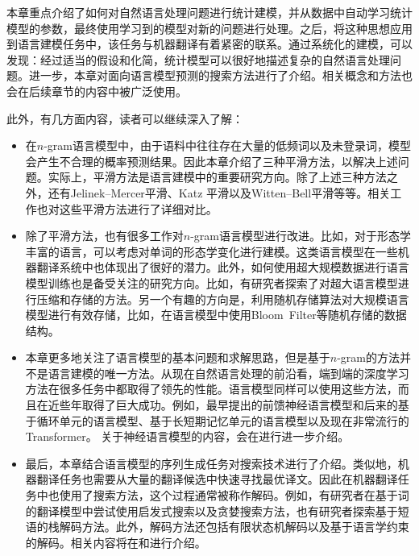 \parinterval 本章重点介绍了如何对自然语言处理问题进行统计建模，并从数据中自动学习统计模型的参数，最终使用学习到的模型对新的问题进行处理。之后，将这种思想应用到语言建模任务中，该任务与机器翻译有着紧密的联系。通过系统化的建模，可以发现：经过适当的假设和化简，统计模型可以很好地描述复杂的自然语言处理问题。进一步，本章对面向语言模型预测的搜索方法进行了介绍。相关概念和方法也会在后续章节的内容中被广泛使用。

\parinterval 此外，有几方面内容，读者可以继续深入了解：

\begin{adjustwidth}{1em}{}
\begin{itemize}
\vspace{0.5em}
\item 在$n$-gram语言模型中，由于语料中往往存在大量的低频词以及未登录词，模型会产生不合理的概率预测结果。因此本章介绍了三种平滑方法，以解决上述问题。实际上，平滑方法是语言建模中的重要研究方向。除了上述三种方法之外，还有Jelinek–Mercer平滑、Katz 平滑以及Witten–Bell平滑等等。相关工作也对这些平滑方法进行了详细对比。
\vspace{0.5em}
\item 除了平滑方法，也有很多工作对$n$-gram语言模型进行改进。比如，对于形态学丰富的语言，可以考虑对单词的形态学变化进行建模。这类语言模型在一些机器翻译系统中也体现出了很好的潜力。此外，如何使用超大规模数据进行语言模型训练也是备受关注的研究方向。比如，有研究者探索了对超大语言模型进行压缩和存储的方法。另一个有趣的方向是，利用随机存储算法对大规模语言模型进行有效存储，比如，在语言模型中使用Bloom\ Filter等随机存储的数据结构。
\vspace{0.5em}
\item 本章更多地关注了语言模型的基本问题和求解思路，但是基于$n$-gram的方法并不是语言建模的唯一方法。从现在自然语言处理的前沿看，端到端的深度学习方法在很多任务中都取得了领先的性能。语言模型同样可以使用这些方法，而且在近些年取得了巨大成功。例如，最早提出的前馈神经语言模型和后来的基于循环单元的语言模型、基于长短期记忆单元的语言模型以及现在非常流行的Transformer。 关于神经语言模型的内容，会在{\chapternine}进行进一步介绍。
\vspace{0.5em}
\item 最后，本章结合语言模型的序列生成任务对搜索技术进行了介绍。类似地，机器翻译任务也需要从大量的翻译候选中快速寻找最优译文。因此在机器翻译任务中也使用了搜索方法，这个过程通常被称作解码。例如，有研究者在基于词的翻译模型中尝试使用启发式搜索以及贪婪搜索方法，也有研究者探索基于短语的栈解码方法。此外，解码方法还包括有限状态机解码以及基于语言学约束的解码。相关内容将在{\chaptereight}和{\chapterfourteen}进行介绍。

\end{itemize}
\end{adjustwidth}
